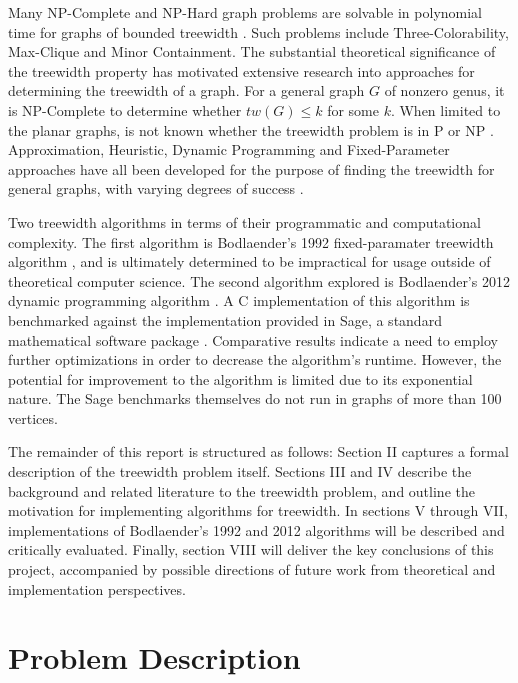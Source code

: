 \documentclass[12pt,conference]{IEEEtran}
\theoremstyle{plain}
\begin{document}
Many NP-Complete and NP-Hard graph problems are solvable in polynomial time for graphs of bounded treewidth \cite{bodlaender-treewidth-power}. Such problems include Three-Colorability, Max-Clique and Minor Containment. The substantial theoretical significance of the treewidth property has motivated extensive research into approaches for determining the treewidth of a graph. For a general graph $G$ of nonzero genus, it is NP-Complete to determine whether $tw(G) \leq k$ for some $k$. When limited to the planar graphs, is not known whether the treewidth problem is in P or NP \cite{planar-treewidth-unsolved}. Approximation, Heuristic, Dynamic Programming and Fixed-Parameter approaches have all been developed for the purpose of finding the treewidth for general graphs, with varying degrees of success \cite{treewidth-survey}. 

Two treewidth algorithms in terms of their programmatic and computational complexity. The first algorithm is Bodlaender's 1992 fixed-paramater treewidth algorithm \cite{bodlaender-1992}, and is ultimately determined to be impractical for usage outside of theoretical computer science. The second algorithm explored is Bodlaender's 2012 dynamic programming algorithm \cite{bodlaender-2012}. A C implementation of this algorithm is benchmarked against the implementation provided in Sage, a standard mathematical software package \cite{sage-original}. Comparative results indicate a need to employ further optimizations in order to decrease the algorithm's runtime. However, the potential for improvement to the algorithm is limited due to its exponential nature. The Sage benchmarks themselves do not run in graphs of more than 100 vertices.

The remainder of this report is structured as follows: Section II captures a formal description of the treewidth problem itself. Sections III and IV describe the background and related literature to the treewidth problem, and outline the motivation for implementing algorithms for treewidth. In sections V through VII, implementations of Bodlaender's 1992 and 2012 algorithms will be described and critically evaluated. Finally, section VIII will deliver the key conclusions of this project, accompanied by possible directions of future work from theoretical and implementation perspectives.

\section{Problem Description}
\end{document}
